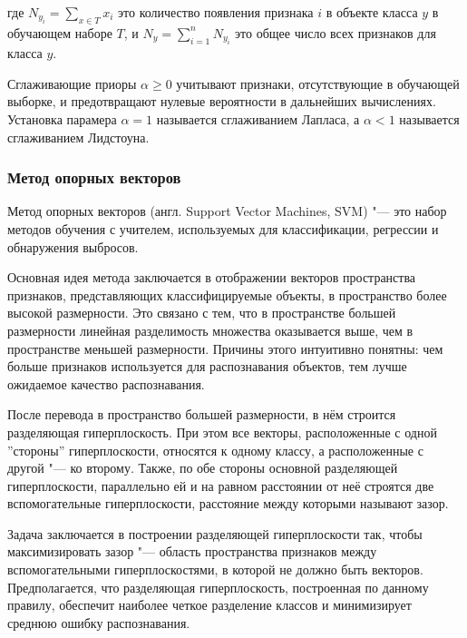 \documentclass[bachelor, och, coursework]{SCWorks}
\begin{document}
            где $N_{y_i} = \sum_{x \in T} x_i$ это количество появления признака
            $i$ в объекте класса $y$ в обучающем наборе $T$, и $N_y = \sum_{i =
            1}^{n} N_{y_i}$ это общее число всех признаков для класса $y$.

            Сглаживающие приоры $\alpha \geq 0$ учитывают признаки,
            отсутствующие в обучающей выборке, и предотвращают нулевые
            вероятности в дальнейших вычислениях. Установка парамера $\alpha =
            1$ называется сглаживанием Лапласа, а $\alpha < 1$ называется
            сглаживанием Лидстоуна.

        \subsubsection{Метод опорных векторов}


            Метод опорных векторов (англ. Support Vector Machines, SVM) "--- это
            набор методов обучения с учителем, используемых для классификации,
            регрессии и обнаружения выбросов.

            Основная идея метода заключается в отображении векторов пространства
            признаков, представляющих классифицируемые объекты, в пространство
            более высокой размерности. Это связано с тем, что в пространстве
            большей размерности линейная разделимость множества оказывается
            выше, чем в пространстве меньшей размерности. Причины этого
            интуитивно понятны: чем больше признаков используется для
            распознавания объектов, тем лучше ожидаемое качество распознавания.

            После перевода в пространство большей размерности, в нём строится
            разделяющая гиперплоскость. При этом все векторы, расположенные с
            одной ''стороны'' гиперплоскости, относятся к одному классу, а
            расположенные с другой "--- ко второму. Также, по обе стороны
            основной разделяющей гиперплоскости, параллельно ей и на равном
            расстоянии от неё строятся две вспомогательные гиперплоскости,
            расстояние между которыми называют зазор.

            Задача заключается в построении разделяющей гиперплоскости так,
            чтобы максимизировать зазор "--- область пространства признаков
            между вспомогательными гиперплоскостями, в которой не должно быть
            векторов. Предполагается, что разделяющая гиперплоскость,
            построенная по данному правилу, обеспечит наиболее четкое разделение
            классов и минимизирует среднюю ошибку распознавания.
\end{document}
